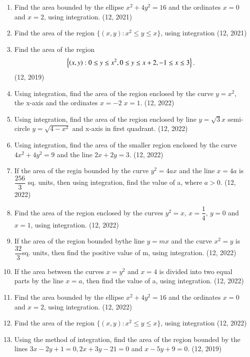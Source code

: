 \begin{enumerate}[label=\thesubsection.\arabic*,ref=\thesubsection.\theenumi]
\item Find the area bounded by the ellipse $x^2+4y^2=16$ and the ordinates $x=0$ and $x=2$, using integration.
\hfill (12, 2021)

\item Find the area of the region $\{(x,y) : x^2 \leq y \leq x\}$, using integration
\hfill (12, 2021)
\item Find the area of the region 
\begin{align*}
    \left\{(x,y):0\leq y \leq x^{2},0 \leq y \leq x +2 , -1 \leq x \leq 3\right\}.
\end{align*}
\hfill (12, 2019)
\item Using integration, find the area of the region enclosed by the curve $ y=x^2 $, the x-axis and the ordinates $x=-2$  $x=1$.
\hfill (12, 2022)
\item Using integration, find the area of the region enclosed by line $y=\sqrt{3}x$ semi-circle $y=\sqrt{4-x^2}$ and x-axis in first quadrant.
\hfill (12, 2022)
\item Using integration, find the area of the smaller region enclosed by the curve ${4x^2 + 4y^2} = 9$ and the line $2x + 2y =3$.
\hfill (12, 2022)

\item If the area of the regin bounded by the curve $y^2 = 4ax$ and the line $x = 4a$ is $\dfrac{256}{3}$\hspace{0.2cm} sq. units, then using integration, find the value of a, where $a>0$.
\hfill (12, 2022)

\item Find the area of the region enclosed by the curves $y^2=x$, $x=\dfrac{1}{4}$,  $y=0$ and $x=1$, using integration.
\hfill (12, 2022)

\item If the area of the region bounded bythe line $y=mx$ and the curve $x^2=y$ is $\dfrac{32}{3}$\hspace{0.2cm}sq. units, then find the positive value of m, using integration.
\hfill (12, 2022)

\item If the area between the curves $x = y^2$ and $x = 4$ is divided into two equal parts by the line $x = a$, then find the value of a, using integration.
\hfill (12, 2022)

\item Find the area bounded by the ellipse $x^2+4y^2=16$ and the ordinates $x=0$ and $x=2$, using integration.
\hfill (12, 2022)

\item Find the area of the region $\{(x,y) : x^2 \leq y \leq x\}$, using integration
\hfill (12, 2022)
\item Using the method of integration, find the area of the region bounded by the lines $3x - 2y + 1 = 0, 2x + 3y - 21 = 0$ and $x - 5y + 9 = 0$.
\hfill (12, 2019)



\end{enumerate}
